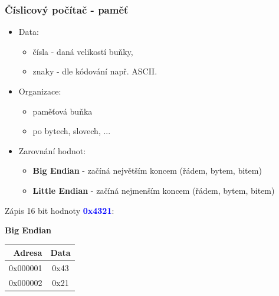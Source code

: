 	\begin{frame}
    \frametitle{Číslicový počítač - paměť}
		
		\begin{minipage}[t][\textheight][t]{0.5\textwidth}
		\small
		\begin{itemize}
			\item Data:
			
			\begin{itemize}
				\item čísla - daná velikostí buňky,
				\item znaky - dle kódování např. ASCII.
			\end{itemize}
			
			\item Organizace:
			
			\begin{itemize}
				\item paměťová buňka
				\item po bytech, slovech, ... 
			\end{itemize}
			
			\item Zarovnání  hodnot:
			
			\begin{itemize}
				\item \textbf{Big Endian} - začíná největším koncem (řádem, bytem, bitem)
				\item \textbf{Little Endian} - začíná nejmenším koncem (řádem, bytem, bitem)
			\end{itemize}
		\end{itemize}
	
		\end{minipage}
		\begin{minipage}[t][\textheight][t]{0.45\textwidth}
		Zápis 16 bit hodnoty \textcolor{blue}{\textbf{0x4321}}:
		
		\vspace{2mm}
		\textbf{Big Endian}
		
		\begin{center}
			\begin{tabular}{| r | c |}
				\hline
				\textbf{Adresa} & \textbf{Data} \\
				\hline
				0x000001 & 0x43 \\
				\hline
				0x000002 & 0x21 \\
				\hline
			\end{tabular}
		\end{center}
		

\end{minipage}
\end{frame}
